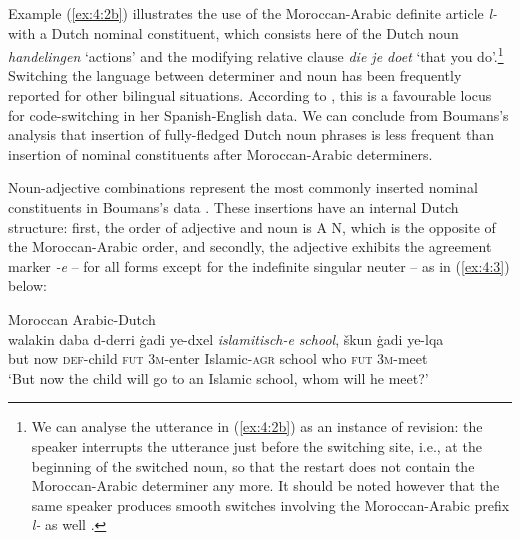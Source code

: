 \noindent Example (\ref{ex:4:2b}) illustrates the use of the Moroccan-Arabic definite article \textit{l-} with a Dutch nominal constituent, which consists here of the Dutch noun \textit{handelingen} `actions' and the modifying relative clause \textit{die je doet} `that you do'.\footnote{We can analyse the utterance in (\ref{ex:4:2b}) as an instance of revision: the speaker interrupts the utterance just before the switching site, i.e., at the beginning of the switched noun, so that the restart does not contain the Moroccan-Arabic determiner any more. It should be noted however that the same speaker produces smooth switches involving the Moroccan-Arabic prefix \textit{l-} as well \citep[cf.][185]{boumans-syntax-1998}.} Switching the language between determiner and noun has been frequently reported for other bilingual situations. According to \citet[604]{poplack-sometimes-1980}, this is a favourable locus for code-switching in her Spanish-English data. We can conclude from Boumans's analysis that insertion of fully-fledged Dutch noun phrases is less frequent than insertion of nominal constituents after Moroccan-Arabic determiners.

Noun-adjective combinations represent the most commonly inserted nominal constituents in Boumans's data \citep[cf.][203--205]{boumans-syntax-1998}. These insertions have an internal Dutch structure: first, the order of adjective and noun is A N, which is the opposite of the Moroccan-Arabic order, and secondly, the adjective exhibits the agreement marker \textit{-e} -- for all forms except for the indefinite singular neuter -- as in (\ref{ex:4:3}) below: 

\ea
\label{ex:4:3}
Moroccan Arabic-Dutch \citep[204]{boumans-syntax-1998}\\
\gll walakin daba d-derri ġadi ye-dxel \textit{islamitisch-e} \textit{school}, škun ġadi ye-lqa\\
	but now \textsc{def}-child \textsc{fut} \textsc{3m}-enter Islamic-\textsc{agr} school who \textsc{fut} \textsc{3m}-meet\\
\glt `But now the child will go to an Islamic school, whom will he meet?'
\z

